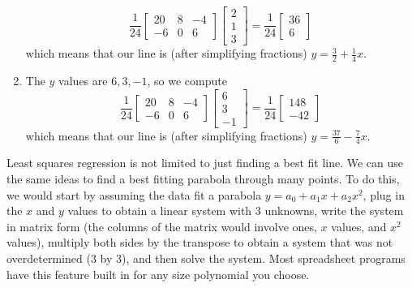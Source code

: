 \begin{example}
\begin{enumerate}
$$\frac{1}{24}\begin{bmatrix}20&8&-4\\-6&0&6\end{bmatrix} \begin{bmatrix}2\\1\\3\end{bmatrix}
= \frac{1}{24}\begin{bmatrix}36\\6\end{bmatrix}
$$ which means that our line is (after simplifying fractions) $y=\frac{3}{2}+\frac{1}{4}x$.
%
	\item The $y$ values are $6,3,-1$, so we compute
$$\frac{1}{24}\begin{bmatrix}20&8&-4\\-6&0&6\end{bmatrix} \begin{bmatrix}6\\3\\-1\end{bmatrix}
= \frac{1}{24}\begin{bmatrix}148\\-42\end{bmatrix}
$$ which means that our line is (after simplifying fractions) $y=\frac{37}{6}-\frac{7}{4}x$.
%
\end{enumerate}
\end{example}

Least squares regression is not limited to just finding a best fit line.  We can use the same ideas to find a best fitting parabola through many points.  To do this, we would start by assuming the data fit a parabola $y=a_0+a_1x+a_2x^2$, plug in the $x$ and $y$ values to obtain a linear system with 3 unknowns, write the system in matrix form (the columns of the matrix would involve ones, $x$ values, and $x^2$ values), multiply both sides by the transpose to obtain a system that was not overdetermined (3 by 3), and then solve the system.  Most spreadsheet programs have this feature built in for any size polynomial you choose.



